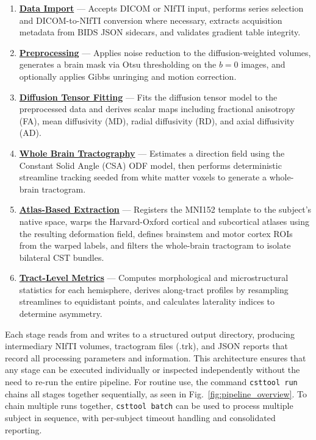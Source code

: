 \begin{enumerate}
	
	\item \hyperref[sec:methods_dataimport]{\textbf{Data Import}} — Accepts DICOM or NIfTI input, performs series selection and DICOM-to-NIfTI conversion where necessary, extracts acquisition metadata from BIDS JSON sidecars, and validates gradient table integrity.
	
	\item \hyperref[sec:methods_preprocessing]{\textbf{Preprocessing}} — Applies noise reduction to the diffusion-weighted volumes, generates a brain mask via Otsu thresholding on the $b = 0$ images, and optionally applies Gibbs unringing and motion correction.
	
	\item \hyperref[sec:methods_diffusiontensorfitting]{\textbf{Diffusion Tensor Fitting}} — Fits the diffusion tensor model to the preprocessed data and derives scalar maps including fractional anisotropy (FA), mean diffusivity (MD), radial diffusivity (RD), and axial diffusivity (AD).
	
	\item \hyperref[sec:methods_wholebraintractography]{\textbf{Whole Brain Tractography}} — Estimates a direction field using the Constant Solid Angle (CSA) ODF model, then performs deterministic streamline tracking seeded from white matter voxels to generate a whole-brain tractogram.
	
	\item \hyperref[sec:methods_atlasbasedextraction]{\textbf{Atlas-Based Extraction}} — Registers the MNI152 template to the subject's native space, warps the Harvard-Oxford cortical and subcortical atlases using the resulting deformation field, defines brainstem and motor cortex ROIs from the warped labels, and filters the whole-brain tractogram to isolate bilateral CST bundles.
	
	\item \hyperref[sec:methods_metrics]{\textbf{Tract-Level Metrics}} — Computes morphological and microstructural statistics for each hemisphere, derives along-tract profiles by resampling streamlines to equidistant points, and calculates laterality indices to determine asymmetry.
	
\end{enumerate}

Each stage reads from and writes to a structured output directory, producing intermediary NIfTI volumes, tractogram files (.trk), and JSON reports that record all processing parameters and information. This architecture ensures that any stage can be executed individually or inspected independently without the need to re-run the entire pipeline. For routine use, the command \texttt{csttool run} chains all stages together sequentially, as seen in Fig.~\ref{fig:pipeline_overview}. To chain multiple runs together, \texttt{csttool batch} can be used to process multiple subject in sequence, with per-subject timeout handling and consolidated reporting.

